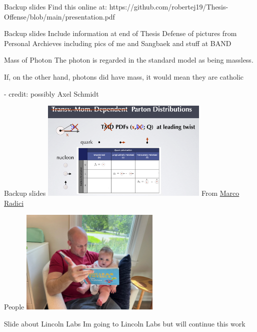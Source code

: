 \documentclass[aspectratio=169]{beamer}
\begin{document}
\begin{frame}{Backup slides}
\centering
    Find this online at: https://github.com/robertej19/Thesis-Offense/blob/main/presentation.pdf
\end{frame}

\begin{frame}{Backup slides}
\centering
    Include information at end of Thesis Defense of pictures from Personal Archieves including pics of me and Sangbaek and stuff at BAND
\end{frame}

\begin{frame}{Mass of Photon}
\centering
The photon is regarded in the standard model as being massless.

If, on the other hand, photons did have mass, it would mean they are catholic 

- credit: possibly Axel Schmidt
\end{frame}


\begin{frame}{Backup slides}
\centering
\includegraphics[width=0.6\textwidth]{backup/pdf_lead_twist.png}
From \href{https://indico.cern.ch/event/797767/contributions/3682622/attachments/1965784/3268756/6_radici.pdf}{Marco Radici}
\end{frame}


\begin{frame}{People}
\includegraphics[width=0.5\textwidth]{people/matt_and_maddie_nuc.jpg}
\end{frame}


\begin{frame}{Slide about Lincoln Labs}
Im going to Lincoln Labs but will continue this work
\end{frame}
\end{document}
